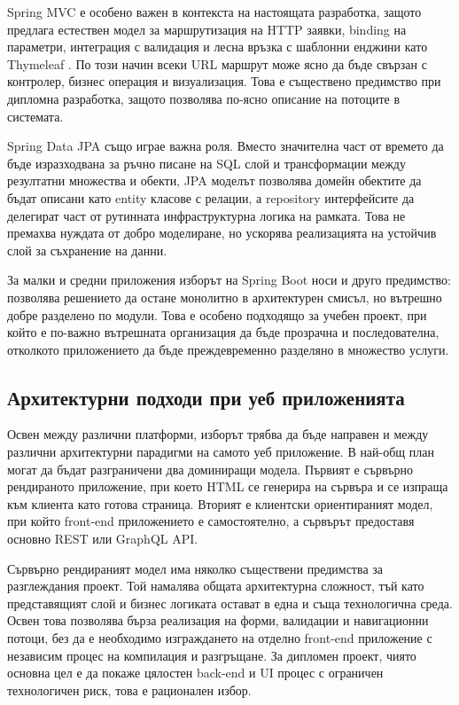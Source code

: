 Spring MVC \cite{springmvc} е особено важен в контекста на настоящата разработка, защото предлага естествен модел за маршрутизация на HTTP заявки, binding на параметри, интеграция с валидация и лесна връзка с шаблонни енджини като Thymeleaf \cite{thymeleaf}. По този начин всеки URL маршрут може ясно да бъде свързан с контролер, бизнес операция и визуализация. Това е съществено предимство при дипломна разработка, защото позволява по-ясно описание на потоците в системата.

Spring Data JPA \cite{springdatajpa} също играе важна роля. Вместо значителна част от времето да бъде изразходвана за ръчно писане на SQL слой и трансформации между резултатни множества и обекти, JPA моделът позволява домейн обектите да бъдат описани като entity класове с релации, а repository интерфейсите да делегират част от рутинната инфраструктурна логика на рамката. Това не премахва нуждата от добро моделиране, но ускорява реализацията на устойчив слой за съхранение на данни.

За малки и средни приложения изборът на Spring Boot носи и друго предимство: позволява решението да остане монолитно в архитектурен смисъл, но вътрешно добре разделено по модули. Това е особено подходящо за учебен проект, при който е по-важно вътрешната организация да бъде прозрачна и последователна, отколкото приложението да бъде преждевременно разделяно в множество услуги.

\subsection{Архитектурни подходи при уеб приложенията}

Освен между различни платформи, изборът трябва да бъде направен и между различни архитектурни парадигми на самото уеб приложение. В най-общ план могат да бъдат разграничени два доминиращи модела. Първият е сървърно рендираното приложение, при което HTML се генерира на сървъра и се изпраща към клиента като готова страница. Вторият е клиентски ориентираният модел, при който front-end приложението е самостоятелно, а сървърът предоставя основно REST или GraphQL API.

Сървърно рендираният модел има няколко съществени предимства за разглеждания проект. Той намалява общата архитектурна сложност, тъй като представящият слой и бизнес логиката остават в една и съща технологична среда. Освен това позволява бърза реализация на форми, валидации и навигационни потоци, без да е необходимо изграждането на отделно front-end приложение с независим процес на компилация и разгръщане. За дипломен проект, чиято основна цел е да покаже цялостен back-end и UI процес с ограничен технологичен риск, това е рационален избор.

